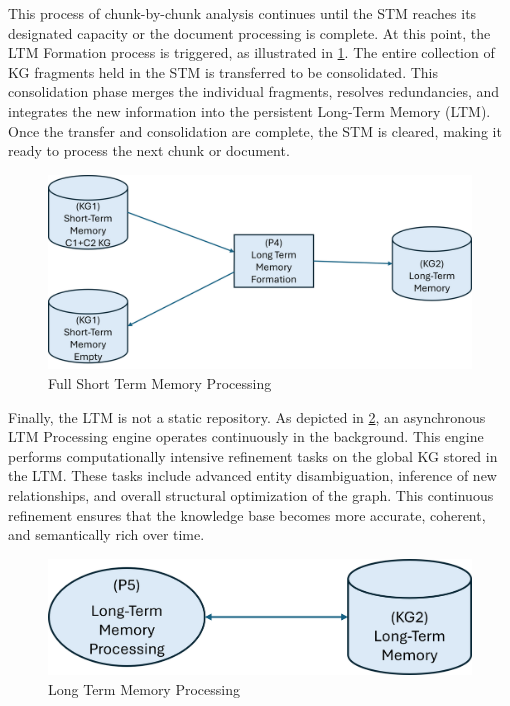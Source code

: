 This process of chunk-by-chunk analysis continues until the STM reaches its designated capacity or the document processing is complete. At this point, the LTM Formation process is triggered, as illustrated in \cref{fig:Full_STM_processing}. The entire collection of KG fragments held in the STM is transferred to be consolidated. This consolidation phase merges the individual fragments, resolves redundancies, and integrates the new information into the persistent Long-Term Memory (LTM). Once the transfer and consolidation are complete, the STM is cleared, making it ready to process the next chunk or document.

\begin{figure}[htp]
    \centering
    \includegraphics[width=\linewidth]{figures/chap3_fig/Full Short Term Memory.png}
    \caption{Full Short Term Memory Processing}
    \label{fig:Full_STM_processing}
\end{figure}

Finally, the LTM is not a static repository. As depicted in \cref{fig:Long_Term_Memory_processing}, an asynchronous LTM Processing engine operates continuously in the background. This engine performs computationally intensive refinement tasks on the global KG stored in the LTM. These tasks include advanced entity disambiguation, inference of new relationships, and overall structural optimization of the graph. This continuous refinement ensures that the knowledge base becomes more accurate, coherent, and semantically rich over time.

\begin{figure}[htp]
    \centering
    \includegraphics[width=\linewidth]{figures/chap3_fig/Long Term Memory Processing.png}
    \caption{Long Term Memory Processing}
    \label{fig:Long_Term_Memory_processing}
\end{figure}

